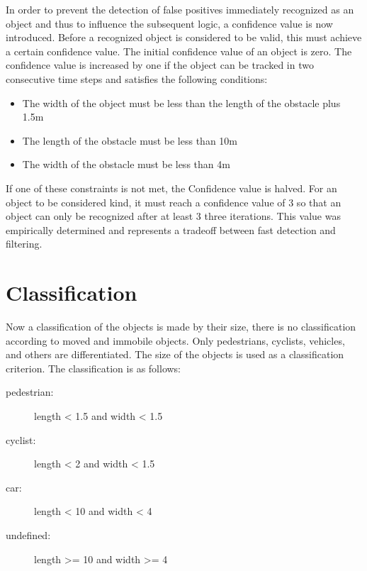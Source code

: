 \documentclass[11pt,oneside,openright]{mpreport}
\begin{document}
In order to prevent the detection of false positives immediately recognized as an object and thus to influence the subsequent logic, a confidence value is now introduced. 
Before a recognized object is considered to be valid, this must achieve a certain confidence value. The initial confidence value of an object is zero. 
The confidence value is increased by one if the object can be tracked in two consecutive time steps and satisfies the following conditions:


\begin{itemize}
\item The width of the object must be less than the length of the obstacle plus 1.5m
\item The length of the obstacle must be less than 10m
\item The width of the obstacle must be less than 4m
\end{itemize}
If one of these constraints is not met, the Confidence value is halved. For an object to be considered kind, it must reach a confidence value of 3 so that an object can only be 
recognized after at least 3 three iterations. This value was empirically determined and represents a tradeoff between fast detection and filtering.


\section{Classification}

Now a classification of the objects is made by their size, there is no classification according to moved and immobile objects.
Only pedestrians, cyclists, vehicles, and others are differentiated. The size of the objects is used as a classification criterion.
The classification is as follows:
\begin{description}
\item[pedestrian:] length < 1.5 and width < 1.5
\item[cyclist:] length < 2 and width < 1.5
\item[car:] length < 10 and width < 4
\item[undefined:] length >= 10 and width >= 4
\end{description}
\end{document}
